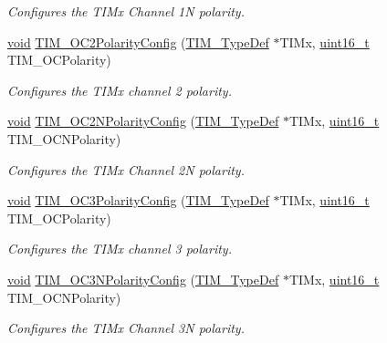 \begin{DoxyCompactItemize}
\begin{DoxyCompactList}\small\item\em Configures the T\-I\-Mx Channel 1\-N polarity. \end{DoxyCompactList}\item 
\hyperlink{group___n_a_m_e_ga18028b8badbf1ea7e704ccac3c488e82}{void} \hyperlink{group___t_i_m___group2_ga6831cacaac1ef50291af94db94450797}{T\-I\-M\-\_\-\-O\-C2\-Polarity\-Config} (\hyperlink{struct_t_i_m___type_def}{T\-I\-M\-\_\-\-Type\-Def} $\ast$T\-I\-Mx, \hyperlink{stdint_8h_a273cf69d639a59973b6019625df33e30}{uint16\-\_\-t} T\-I\-M\-\_\-\-O\-C\-Polarity)
\begin{DoxyCompactList}\small\item\em Configures the T\-I\-Mx channel 2 polarity. \end{DoxyCompactList}\item 
\hyperlink{group___n_a_m_e_ga18028b8badbf1ea7e704ccac3c488e82}{void} \hyperlink{group___t_i_m___group2_ga2fa6ea3a89f446b52b4e699272b70cad}{T\-I\-M\-\_\-\-O\-C2\-N\-Polarity\-Config} (\hyperlink{struct_t_i_m___type_def}{T\-I\-M\-\_\-\-Type\-Def} $\ast$T\-I\-Mx, \hyperlink{stdint_8h_a273cf69d639a59973b6019625df33e30}{uint16\-\_\-t} T\-I\-M\-\_\-\-O\-C\-N\-Polarity)
\begin{DoxyCompactList}\small\item\em Configures the T\-I\-Mx Channel 2\-N polarity. \end{DoxyCompactList}\item 
\hyperlink{group___n_a_m_e_ga18028b8badbf1ea7e704ccac3c488e82}{void} \hyperlink{group___t_i_m___group2_ga1ef43b03fe666495e80aac9741ae7ab0}{T\-I\-M\-\_\-\-O\-C3\-Polarity\-Config} (\hyperlink{struct_t_i_m___type_def}{T\-I\-M\-\_\-\-Type\-Def} $\ast$T\-I\-Mx, \hyperlink{stdint_8h_a273cf69d639a59973b6019625df33e30}{uint16\-\_\-t} T\-I\-M\-\_\-\-O\-C\-Polarity)
\begin{DoxyCompactList}\small\item\em Configures the T\-I\-Mx channel 3 polarity. \end{DoxyCompactList}\item 
\hyperlink{group___n_a_m_e_ga18028b8badbf1ea7e704ccac3c488e82}{void} \hyperlink{group___t_i_m___group2_gac710acc5b682e892584fc6f089f61dc2}{T\-I\-M\-\_\-\-O\-C3\-N\-Polarity\-Config} (\hyperlink{struct_t_i_m___type_def}{T\-I\-M\-\_\-\-Type\-Def} $\ast$T\-I\-Mx, \hyperlink{stdint_8h_a273cf69d639a59973b6019625df33e30}{uint16\-\_\-t} T\-I\-M\-\_\-\-O\-C\-N\-Polarity)
\begin{DoxyCompactList}\small\item\em Configures the T\-I\-Mx Channel 3\-N polarity. \end{DoxyCompactList}\item 

\end{DoxyCompactItemize}
